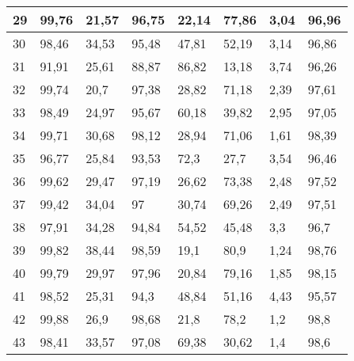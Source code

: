 \begin{longtable}[c]{|l|l|l|l|l|l|l|l|}
29              & 99,76        & 21,57        & 96,75       & 22,14         & 77,86         & 3,04          & 96,96         \\ \hline
30              & 98,46        & 34,53        & 95,48       & 47,81         & 52,19         & 3,14          & 96,86         \\ \hline
31              & 91,91        & 25,61        & 88,87       & 86,82         & 13,18         & 3,74          & 96,26         \\ \hline
32              & 99,74        & 20,7         & 97,38       & 28,82         & 71,18         & 2,39          & 97,61         \\ \hline
33              & 98,49        & 24,97        & 95,67       & 60,18         & 39,82         & 2,95          & 97,05         \\ \hline
34              & 99,71        & 30,68        & 98,12       & 28,94         & 71,06         & 1,61          & 98,39         \\ \hline
35              & 96,77        & 25,84        & 93,53       & 72,3          & 27,7          & 3,54          & 96,46         \\ \hline
36              & 99,62        & 29,47        & 97,19       & 26,62         & 73,38         & 2,48          & 97,52         \\ \hline
37              & 99,42        & 34,04        & 97          & 30,74         & 69,26         & 2,49          & 97,51         \\ \hline
38              & 97,91        & 34,28        & 94,84       & 54,52         & 45,48         & 3,3           & 96,7          \\ \hline
39              & 99,82        & 38,44        & 98,59       & 19,1          & 80,9          & 1,24          & 98,76         \\ \hline
40              & 99,79        & 29,97        & 97,96       & 20,84         & 79,16         & 1,85          & 98,15         \\ \hline
41              & 98,52        & 25,31        & 94,3        & 48,84         & 51,16         & 4,43          & 95,57         \\ \hline
42              & 99,88        & 26,9         & 98,68       & 21,8          & 78,2          & 1,2           & 98,8          \\ \hline
43              & 98,41        & 33,57        & 97,08       & 69,38         & 30,62         & 1,4           & 98,6          \\ \hline

\end{longtable}
